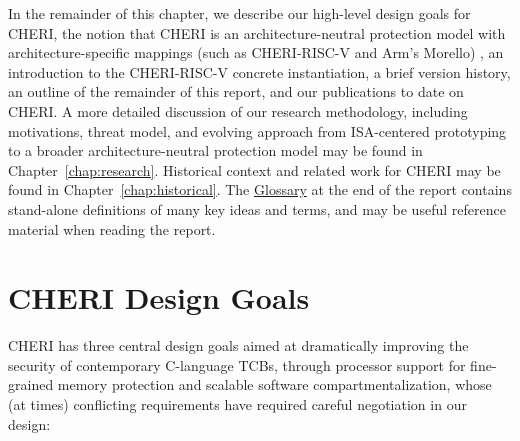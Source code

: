 In the remainder of this chapter, we describe  our high-level design goals
for CHERI, the notion that CHERI is an architecture-neutral protection model
with architecture-specific mappings (such as CHERI-RISC-V and Arm's Morello)%
, an
introduction to the CHERI-RISC-V concrete instantiation, a brief version
history, an outline of the remainder of this report, and our publications to
date on CHERI.
A more detailed discussion of our research methodology, including motivations,
threat model, and evolving approach from ISA-centered prototyping to a broader
architecture-neutral protection model may be found in
Chapter~\ref{chap:research}.
Historical context and related work for CHERI may be found in
Chapter~\ref{chap:historical}.
The \hyperref[glossary]{Glossary} at the end of the report contains
stand-alone definitions of many key ideas and terms, and may be useful
reference material when reading the report.

\section{CHERI Design Goals}

CHERI has three central design goals aimed at dramatically improving the
security of contemporary C-language TCBs, through processor support for
fine-grained memory protection and scalable software compartmentalization,
whose (at times) conflicting requirements have required careful negotiation in
our design:

